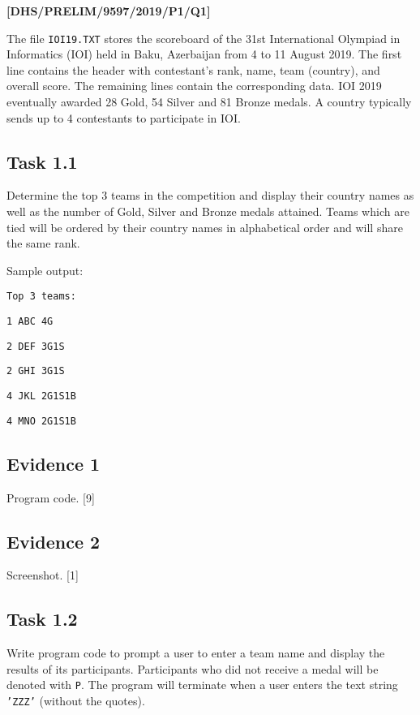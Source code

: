 \item \textbf{{[}DHS/PRELIM/9597/2019/P1/Q1{]} }

The file \texttt{IOI19.TXT} stores the scoreboard of the 31st International
Olympiad in Informatics (IOI) held in Baku, Azerbaijan from 4 to 11
August 2019. The first line contains the header with contestant's
rank, name, team (country), and overall score. The remaining lines
contain the corresponding data. IOI 2019 eventually awarded 28 Gold,
54 Silver and 81 Bronze medals. A country typically sends up to 4
contestants to participate in IOI. 

\subsection*{Task 1.1 }

Determine the top 3 teams in the competition and display their country
names as well as the number of Gold, Silver and Bronze medals attained.
Teams which are tied will be ordered by their country names in alphabetical
order and will share the same rank. 

Sample output: 

\texttt{Top 3 teams: }

\texttt{1 ABC 4G }

\texttt{2 DEF 3G1S }

\texttt{2 GHI 3G1S }

\texttt{4 JKL 2G1S1B }

\texttt{4 MNO 2G1S1B }

\subsection*{Evidence 1 }

Program code. \hfill{}{[}9{]}

\subsection*{Evidence 2 }

Screenshot. \hfill{} {[}1{]}

\subsection*{Task 1.2 }

Write program code to prompt a user to enter a team name and display
the results of its participants. Participants who did not receive
a medal will be denoted with \texttt{P}. The program will terminate
when a user enters the text string \texttt{'ZZZ'} (without the quotes). 

